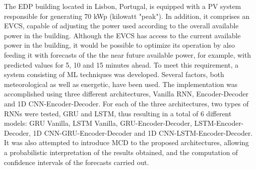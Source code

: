 \noindent The \ac{EDP} building located in Lisbon, Portugal, is equipped with a \ac{PV} system responsible for generating 70 kWp (kilowatt "peak"). In addition, it comprises an \ac{EVCS}, capable of adjusting the power used according to the overall available power in the building. Although the \ac{EVCS} has access to the current available power in the building, it would be possible to optimize its operation by also feeding it with forecasts of the the near future available power, for example, with predicted values for 5, 10 and 15 minutes ahead. To meet this requirement, a system consisting of \ac{ML} techniques was developed. Several factors, both meteorological as well as energetic, have been used. The implementation was accomplished using three different architectures, Vanilla \ac{RNN}, Encoder-Decoder and \ac{1D CNN}-Encoder-Decoder. For each of the three architectures, two types of \ac{RNN}s were tested, \ac{GRU} and \ac{LSTM}, thus resulting in a total of 6 different models: \ac{GRU} Vanilla, \ac{LSTM} Vanilla, \ac{GRU}-Encoder-Decoder, \ac{LSTM}-Encoder-Decoder, \ac{1D CNN}-\ac{GRU}-Encoder-Decoder and \ac{1D CNN}-\ac{LSTM}-Encoder-Decoder. It was also attempted to introduce \ac{MCD} to the proposed architectures, allowing a probabilistic interpretation of the results obtained, and the computation of confidence intervals of the forecasts carried out.
